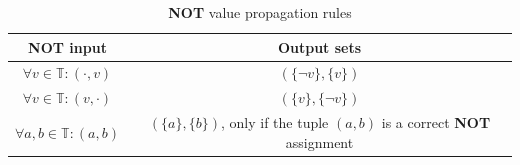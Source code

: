 \begin{table}[h!]
    \centering
    \begin{tabular}{|c|c|}
        \hline
        \rowcolor[HTML]{EAE1E1}
        {\color[HTML]{333333} \textbf{NOT input}} & {\color[HTML]{333333} \textbf{Output sets}}                                      \\ \hline
        $\forall v \in \mathbb{T}: (\cdot, v)$    & $(\{\neg v\}, \{v\})$                                                            \\ \hline
        $\forall v \in \mathbb{T}: (v, \cdot)$    & $(\{v\}, \{\neg v\})$                                                            \\ \hline
        $\forall a,b \in \mathbb{T}:  (a, b)$     & $(\{a\}, \{b\})$, only if the tuple $(a,b)$ is a correct \textbf{NOT} assignment \\ \hline
    \end{tabular}
    \caption{\textbf{NOT} value propagation rules}
    \label{tab:chap-4:not-propagation}
\end{table}



